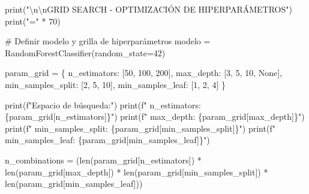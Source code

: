 \documentclass[
  doc,
  floatsintext,
  longtable,
  a4paper,
  nolmodern,
  notxfonts,
  notimes,
  12pt,
  colorlinks=true,linkcolor=blue,citecolor=blue,urlcolor=blue]{apa7}
\newenvironment{Shaded}{\begin{snugshade}}{\end{snugshade}}
\newcommand{\BuiltInTok}[1]{\textcolor[rgb]{0.00,0.23,0.31}{#1}}
\newcommand{\CharTok}[1]{\textcolor[rgb]{0.13,0.47,0.30}{#1}}
\newcommand{\CommentTok}[1]{\textcolor[rgb]{0.37,0.37,0.37}{#1}}
\newcommand{\DecValTok}[1]{\textcolor[rgb]{0.68,0.00,0.00}{#1}}
\newcommand{\NormalTok}[1]{\textcolor[rgb]{0.00,0.23,0.31}{#1}}
\newcommand{\OperatorTok}[1]{\textcolor[rgb]{0.37,0.37,0.37}{#1}}
\newcommand{\SpecialCharTok}[1]{\textcolor[rgb]{0.37,0.37,0.37}{#1}}
\newcommand{\SpecialStringTok}[1]{\textcolor[rgb]{0.13,0.47,0.30}{#1}}
\newcommand{\StringTok}[1]{\textcolor[rgb]{0.13,0.47,0.30}{#1}}
\newcommand{\VariableTok}[1]{\textcolor[rgb]{0.07,0.07,0.07}{#1}}
\begin{document}
\begin{Shaded}
\begin{Highlighting}[]
\BuiltInTok{print}\NormalTok{(}\StringTok{"}\CharTok{\textbackslash{}n\textbackslash{}n}\StringTok{GRID SEARCH {-} OPTIMIZACIÓN DE HIPERPARÁMETROS"}\NormalTok{)}
\BuiltInTok{print}\NormalTok{(}\StringTok{"="} \OperatorTok{*} \DecValTok{70}\NormalTok{)}

\CommentTok{\# Definir modelo y grilla de hiperparámetros}
\NormalTok{modelo }\OperatorTok{=}\NormalTok{ RandomForestClassifier(random\_state}\OperatorTok{=}\DecValTok{42}\NormalTok{)}

\NormalTok{param\_grid }\OperatorTok{=}\NormalTok{ \{}
    \StringTok{\textquotesingle{}n\_estimators\textquotesingle{}}\NormalTok{: [}\DecValTok{50}\NormalTok{, }\DecValTok{100}\NormalTok{, }\DecValTok{200}\NormalTok{],}
    \StringTok{\textquotesingle{}max\_depth\textquotesingle{}}\NormalTok{: [}\DecValTok{3}\NormalTok{, }\DecValTok{5}\NormalTok{, }\DecValTok{10}\NormalTok{, }\VariableTok{None}\NormalTok{],}
    \StringTok{\textquotesingle{}min\_samples\_split\textquotesingle{}}\NormalTok{: [}\DecValTok{2}\NormalTok{, }\DecValTok{5}\NormalTok{, }\DecValTok{10}\NormalTok{],}
    \StringTok{\textquotesingle{}min\_samples\_leaf\textquotesingle{}}\NormalTok{: [}\DecValTok{1}\NormalTok{, }\DecValTok{2}\NormalTok{, }\DecValTok{4}\NormalTok{]}
\NormalTok{\}}

\BuiltInTok{print}\NormalTok{(}\SpecialStringTok{f"Espacio de búsqueda:"}\NormalTok{)}
\BuiltInTok{print}\NormalTok{(}\SpecialStringTok{f"  n\_estimators: }\SpecialCharTok{\{}\NormalTok{param\_grid[}\StringTok{\textquotesingle{}n\_estimators\textquotesingle{}}\NormalTok{]}\SpecialCharTok{\}}\SpecialStringTok{"}\NormalTok{)}
\BuiltInTok{print}\NormalTok{(}\SpecialStringTok{f"  max\_depth: }\SpecialCharTok{\{}\NormalTok{param\_grid[}\StringTok{\textquotesingle{}max\_depth\textquotesingle{}}\NormalTok{]}\SpecialCharTok{\}}\SpecialStringTok{"}\NormalTok{)}
\BuiltInTok{print}\NormalTok{(}\SpecialStringTok{f"  min\_samples\_split: }\SpecialCharTok{\{}\NormalTok{param\_grid[}\StringTok{\textquotesingle{}min\_samples\_split\textquotesingle{}}\NormalTok{]}\SpecialCharTok{\}}\SpecialStringTok{"}\NormalTok{)}
\BuiltInTok{print}\NormalTok{(}\SpecialStringTok{f"  min\_samples\_leaf: }\SpecialCharTok{\{}\NormalTok{param\_grid[}\StringTok{\textquotesingle{}min\_samples\_leaf\textquotesingle{}}\NormalTok{]}\SpecialCharTok{\}}\SpecialStringTok{"}\NormalTok{)}

\NormalTok{n\_combinations }\OperatorTok{=}\NormalTok{ (}\BuiltInTok{len}\NormalTok{(param\_grid[}\StringTok{\textquotesingle{}n\_estimators\textquotesingle{}}\NormalTok{]) }\OperatorTok{*} 
                  \BuiltInTok{len}\NormalTok{(param\_grid[}\StringTok{\textquotesingle{}max\_depth\textquotesingle{}}\NormalTok{]) }\OperatorTok{*}
                  \BuiltInTok{len}\NormalTok{(param\_grid[}\StringTok{\textquotesingle{}min\_samples\_split\textquotesingle{}}\NormalTok{]) }\OperatorTok{*}
                  \BuiltInTok{len}\NormalTok{(param\_grid[}\StringTok{\textquotesingle{}min\_samples\_leaf\textquotesingle{}}\NormalTok{]))}


\end{Highlighting}
\end{Shaded}
\end{document}
